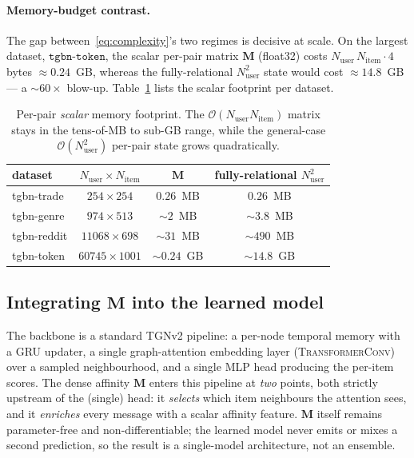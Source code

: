 \paragraph{Memory-budget contrast.}
The gap between~\eqref{eq:complexity}'s two regimes is decisive at scale. On the
largest dataset, $\texttt{tgbn-token}$, the scalar per-pair matrix
$\mathbf{M}$ (float32) costs $N_{\text{user}}\,N_{\text{item}}\cdot 4$ bytes
$\approx 0.24$~GB, whereas the fully-relational $N_{\text{user}}^{2}$ state would
cost $\approx 14.8$~GB --- a $\sim\!60\times$ blow-up.
Table~\ref{tab:mem-budget} lists the scalar footprint per dataset.
\begin{table}[t]
\centering
\begin{tabular}{lccc}
\hline
dataset & $N_{\text{user}}\!\times\!N_{\text{item}}$ & $\mathbf{M}$ & fully-relational $N_{\text{user}}^{2}$ \\
\hline
tgbn-trade  & $254\times254$      & $0.26$~MB & $0.26$~MB \\
tgbn-genre  & $974\times513$      & $\sim 2$~MB   & $\sim 3.8$~MB \\
tgbn-reddit & $11068\times698$    & $\sim 31$~MB  & $\sim 490$~MB \\
tgbn-token  & $60745\times1001$   & $\sim 0.24$~GB & $\sim 14.8$~GB \\
\hline
\end{tabular}
\caption{Per-pair \emph{scalar} memory footprint. The $\mathcal{O}(N_{\text{user}}N_{\text{item}})$
matrix stays in the tens-of-MB to sub-GB range, while the general-case
$\mathcal{O}(N_{\text{user}}^{2})$ per-pair state grows quadratically.}
\label{tab:mem-budget}
\end{table}

\subsection{Integrating $\mathbf{M}$ into the learned model}
\label{subsec:integration}

The backbone is a standard TGNv2 pipeline: a per-node temporal memory with a GRU
updater, a single graph-attention embedding layer (\textsc{TransformerConv}) over a
sampled neighbourhood, and a single MLP head producing the per-item scores. The
dense affinity $\mathbf{M}$ enters this pipeline at \emph{two} points, both strictly
upstream of the (single) head: it \emph{selects} which item neighbours the attention
sees, and it \emph{enriches} every message with a scalar affinity feature. $\mathbf{M}$
itself remains parameter-free and non-differentiable; the learned model never emits
or mixes a second prediction, so the result is a single-model architecture, not an
ensemble.

